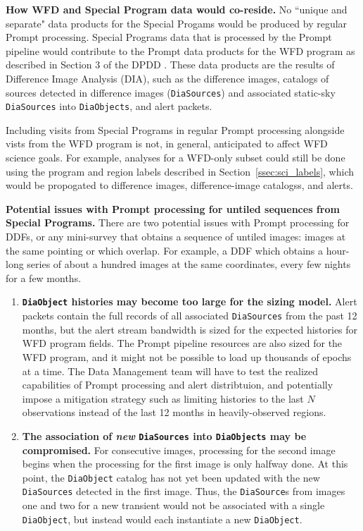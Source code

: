 \textbf{How WFD and Special Program data would co-reside.}
No ``unique and separate" data products for the Special Progams would be 
produced by regular Prompt processing.
Special Programs data that is processed by the Prompt pipeline would 
contribute to the Prompt data products for the WFD program as 
described in Section 3 of the DPDD . 
These data products are the results of Difference Image Analysis (DIA),
such as the difference images, catalogs of sources detected in difference
images ({\tt DiaSources}) and associated static-sky {\tt DiaSources}
into {\tt DiaObjects}, and alert packets.

Including visits from Special Programs in regular Prompt processing alongside
vists from the WFD program is not, in general, anticipated to affect WFD science goals.
For example, analyses for a WFD-only subset could still be done using the program and
region labels described in Section~\ref{ssec:sci_labels}, which would be
propogated to difference images, difference-image catalogss, and alerts.

\textbf{Potential issues with Prompt processing for untiled sequences from Special Programs.}
There are two potential issues with Prompt processing for DDFs, or any mini-survey 
that obtains a sequence of untiled images: images at the same pointing or which overlap.
For example, a DDF which obtains a hour-long series of about a hundred images at the same coordinates,
every few nights for a few months.

\begin{enumerate}

\item \textbf{{\tt DiaObject} histories may become too large for the sizing model.}
Alert packets contain the full records of all associated 
{\tt DiaSources} from the past 12 months, but the alert
stream bandwidth is sized for the expected histories for
WFD program fields. 
The Prompt pipeline resources are also sized for the
WFD program, and it might not be possible to load up
thousands of epochs at a time.
The Data Management team will have to test the realized
capabilities of Prompt processing and alert distribtuion,
and potentially impose a mitigation strategy such as
limiting histories to the last $N$ observations instead
of the last 12 months in heavily-observed regions.

\item \textbf{The association of {\it new} {\tt DiaSources} into {\tt DiaObjects} 
may be compromised.}
For consecutive images, processing for the second image begins when the processing for the 
first image is only halfway done.
At this point, the {\tt DiaObject} catalog has 
not yet been updated with the new {\tt DiaSources} detected in the first image.
Thus, the {\tt DiaSource}s from images one and two for a new transient 
would not be associated with a single {\tt DiaObject}, but instead would 
each instantiate a new {\tt DiaObject}.

\end{enumerate}

